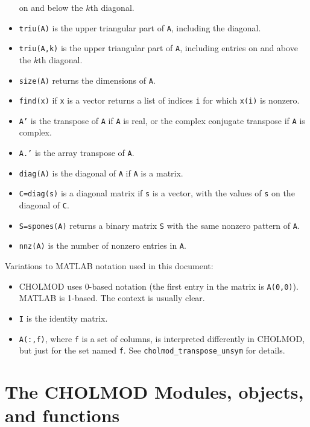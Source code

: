 \documentclass[11pt]{article}
\begin{document}
\begin{itemize}
	on and below the $k$th diagonal.
    \item {\tt triu(A)} is the upper triangular part of {\tt A}, including the diagonal.
    \item {\tt triu(A,k)} is the upper triangular part of {\tt A}, including entries
	on and above the $k$th diagonal.
    \item {\tt size(A)} returns the dimensions of {\tt A}.
    \item {\tt find(x)} if {\tt x} is a vector returns a list of indices {\tt i}
	for which {\tt x(i)} is nonzero.
    \item {\tt A'} is the transpose of {\tt A} if {\tt A} is real, or
	the complex conjugate transpose if {\tt A} is complex.
    \item {\tt A.'} is the array transpose of {\tt A}.
    \item {\tt diag(A)} is the diagonal of {\tt A} if {\tt A} is a matrix.
    \item {\tt C=diag(s)} is a diagonal matrix if {\tt s} is a vector,
	with the values of {\tt s} on the diagonal of {\tt C}.
    \item {\tt S=spones(A)} returns a binary matrix {\tt S} with the
	same nonzero pattern of {\tt A}.
    \item {\tt nnz(A)} is the number of nonzero entries in {\tt A}.
\end{itemize}

\noindent Variations to MATLAB notation used in this document:
\begin{itemize}
    \item CHOLMOD uses 0-based notation (the first entry in the matrix is
	{\tt A(0,0)}).  MATLAB is 1-based.  The context is usually clear.
    \item {\tt I} is the identity matrix.
    \item {\tt A(:,f)}, where {\tt f} is a set of columns, is interpreted
	differently in CHOLMOD, but just for the set named {\tt f}.
	See {\tt cholmod\_transpose\_unsym} for details.
\end{itemize}

\newpage \section{The CHOLMOD Modules, objects, and functions}
\label{Modules}
\end{document}
